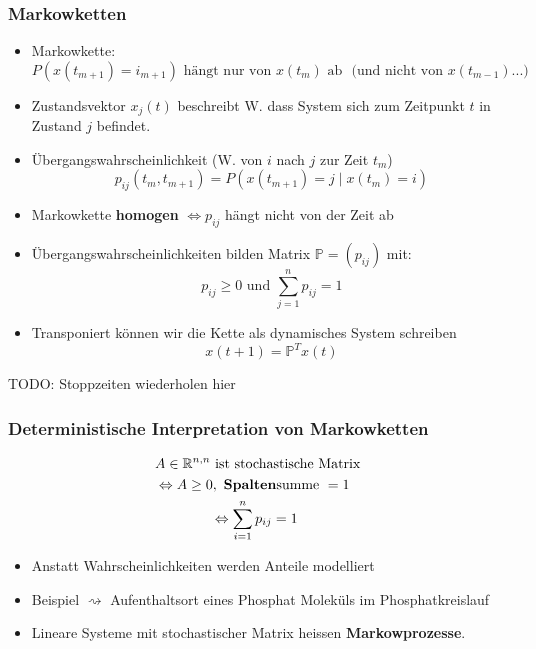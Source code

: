 \documentclass[a4paper]{article}
\newcommand{\R}{\mathbb{R}}
\begin{document}
\subsubsection{Markowketten}
\begin{itemize}
	\item Markowkette:
		\[
			P(x(t_{m+1}) = i_{m+1})
			\text{ hängt nur von $x(t_m)$ ab }
			\text{ (und nicht von $x(t_{m-1})...$) }
		\] 
	\item Zustandsvektor $x_{j} (t)$ beschreibt W. dass System
		sich zum Zeitpunkt $t$ in Zustand $j$ befindet.
	\item Übergangswahrscheinlichkeit (W. von $i$ nach $j$ zur Zeit $t_m$)
		\[
			p_{ij} (t_m , t_{m+1}) =
			P(x(t_{m+1}) = j \; \vert \; x(t_m) = i)
		\] 
	\item Markowkette \textbf{homogen} $\Leftrightarrow
		p_{ij}$ hängt nicht von der Zeit ab
	\item Übergangswahrscheinlichkeiten bilden Matrix $\mathbb{P} = (p_{ij})$
		mit:
		\[
		p_{ij} \geq 0 \text{ und }
		\sum_{j=1}^{n} p_{ij} = 1
		\] 
	\item Transponiert können wir die Kette als dynamisches System schreiben
		\[
			x(t+1) = \mathbb{P} ^{T} x(t)
		\] 
\end{itemize}

TODO: Stoppzeiten wiederholen hier

\subsubsection{Deterministische Interpretation von Markowketten}
\begin{align*}
	& A \in \R ^{n,n} \text{ ist stochastische Matrix } \\
	&\Leftrightarrow A \geq 0, \text{ \textbf{Spalten}summe } = 1 \\
	& \qquad \qquad \Leftrightarrow \sum_{i=1}^{n} p_{ij} = 1 \\
\end{align*}

\begin{itemize}
	\item Anstatt Wahrscheinlichkeiten werden Anteile modelliert
	\item Beispiel $\rightsquigarrow$ Aufenthaltsort eines Phosphat Moleküls im
		Phosphatkreislauf
	\item Lineare Systeme mit stochastischer Matrix heissen
		\textbf{Markowprozesse}.
\end{itemize}
\end{document}
